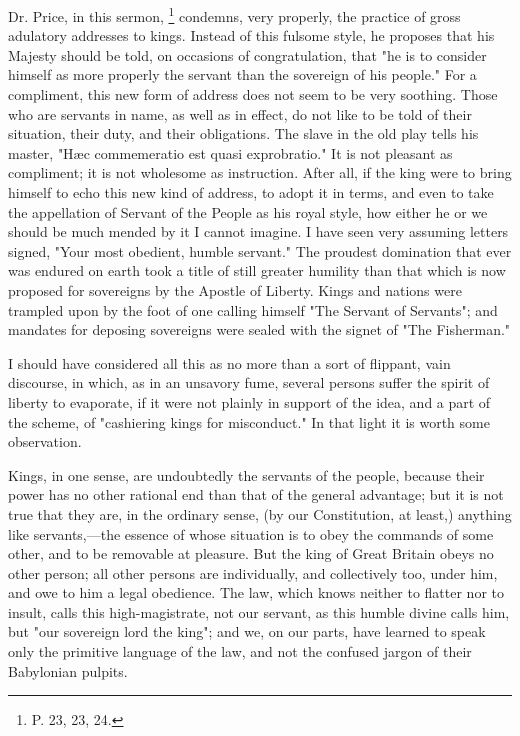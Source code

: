 Dr. Price, in this sermon,
\footnote{ P. 23, 23, 24.}
 condemns, very properly, the practice of gross adulatory addresses to kings. Instead of this fulsome style, he proposes that his Majesty should be told, on occasions of congratulation, that "he is to consider himself as more properly the servant than the sovereign of his people." For a compliment, this new form of address does not seem to be very soothing. Those who are servants in name, as well as in effect, do not like to be told of their situation, their duty, and their obligations. The slave in the old play tells his master, "Hæc commemeratio est quasi exprobratio." It is not pleasant as compliment; it is not wholesome as instruction. After all, if the king were to bring himself to echo this new kind of address, to adopt it in terms, and even to take the appellation of Servant of the People as his royal style, how either he or we should be much mended by it I cannot imagine. I have seen very assuming letters signed, "Your most obedient, humble servant." The proudest domination that ever was endured on earth took a title of still greater humility than that which is now proposed for sovereigns by the Apostle of Liberty. Kings and nations were trampled upon by the foot of one calling himself "The Servant of Servants"; and mandates for deposing sovereigns were sealed with the signet of "The Fisherman."

I should have considered all this as no more than a sort of flippant, vain discourse, in which, as in an unsavory fume, several persons suffer the spirit of liberty to evaporate, if it were not plainly in support of the idea, and a part of the scheme, of "cashiering kings for misconduct." In that light it is worth some observation.

Kings, in one sense, are undoubtedly the servants of the people, because their power has no other rational end than that of the general advantage; but it is not true that they are, in the ordinary sense, (by our Constitution, at least,) anything like servants,—the essence of whose situation is to obey the commands of some other, and to be removable at pleasure. But the king of Great Britain obeys no other person; all other persons are individually, and collectively too, under him, and owe to him a legal obedience. The law, which knows neither to flatter nor to insult, calls this high-magistrate, not our servant, as this humble divine calls him, but "our sovereign lord the king"; and we, on our parts, have learned to speak only the primitive language of the law, and not the confused jargon of their Babylonian pulpits.

